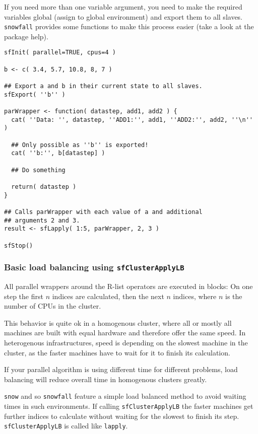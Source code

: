 \documentclass[10pt,oneside]{article}
\begin{document}
If you need more than one variable argument, you need to make the required
variables global (assign to global environment) and export them to all
slaves. \texttt{snowfall} provides some functions to make this process
easier (take a look at the package help).

\begin{verbatim}
sfInit( parallel=TRUE, cpus=4 )

b <- c( 3.4, 5.7, 10.8, 8, 7 )

## Export a and b in their current state to all slaves.
sfExport( ''b'' )

parWrapper <- function( datastep, add1, add2 ) {
  cat( ''Data: '', datastep, ''ADD1:'', add1, ''ADD2:'', add2, ''\n'' )

  ## Only possible as ''b'' is exported!
  cat( ''b:'', b[datastep] )

  ## Do something

  return( datastep )
}

## Calls parWrapper with each value of a and additional
## arguments 2 and 3.
result <- sfLapply( 1:5, parWrapper, 2, 3 )

sfStop()
\end{verbatim}

\subsubsection{Basic load balancing using \texttt{sfClusterApplyLB}}
All parallel wrappers around the R-list operators are executed in
blocks: On one step the first $n$ indices are calculated, then the next
$n$ indices, where $n$ is the number of CPUs in the cluster.

This behavior is quite ok in a homogenous cluster, where all or mostly
all machines are built with equal hardware and therefore offer the same
speed. In heterogenous infrastructures, speed is depending on the
slowest machine in the cluster, as the faster machines have to wait for it
to finish its calculation.

If your parallel algorithm is using different time for different problems,
load balancing will reduce overall time in homogenous clusters greatly.

\texttt{snow} and so \texttt{snowfall} feature a simple load balanced method
to avoid waiting times in such environments. If calling
\texttt{sfClusterApplyLB} the faster machines get further indices to
calculate without waiting for the slowest to finish its step.
\texttt{sfClusterApplyLB} is called like \texttt{lapply}.
\end{document}
